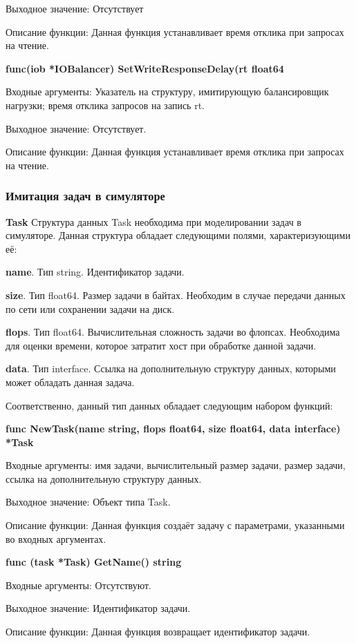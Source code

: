 Выходное значение: Отсутствует 

Описание функции: Данная функция устанавливает время отклика при запросах на чтение.

\textbf{func(iob *IOBalancer) SetWriteResponseDelay(rt float64}

Входные аргументы: Указатель на структуру, имитирующую балансировщик нагрузки; время отклика запросов на запись rt.

Выходное значение: Отсутствует.

Описание функции: Данная функция устанавливает время отклика при запросах на чтение.

\subsubsection{Имитация задач в симуляторе}
\textbf{Task}
Структура данных Task необходима при моделировании задач в симуляторе. Данная структура обладает следующими полями, характеризующими  её:

\textbf{	name}. Тип  string. Идентификатор задачи.

\textbf{	size}. Тип float64. Размер задачи в байтах. Необходим в случае передачи данных по сети или сохранении задачи на диск.

\textbf{	flops}. Тип   float64. Вычислительная сложность задачи во флопсах. Необходима для оценки времени, которое затратит хост при обработке данной задачи.

\textbf{	data}. Тип interface{}. Ссылка на дополнительную структуру данных, которыми может обладать данная задача. 

Соответственно, данный тип данных обладает следующим набором функций:

\textbf{func NewTask(name string, flops float64, size float64, data interface{}) *Task}

Входные аргументы: имя задачи, вычислительный размер задачи, размер задачи, ссылка на дополнительную структуру данных.

Выходное значение: Объект типа Task.

Описание функции: Данная функция создаёт задачу с параметрами, указанными во входных аргументах.

\textbf{	func (task *Task) GetName() string }

Входные аргументы: Отсутствуют.

Выходное значение: Идентификатор задачи. 

Описание функции: Данная функция возвращает идентификатор задачи.

